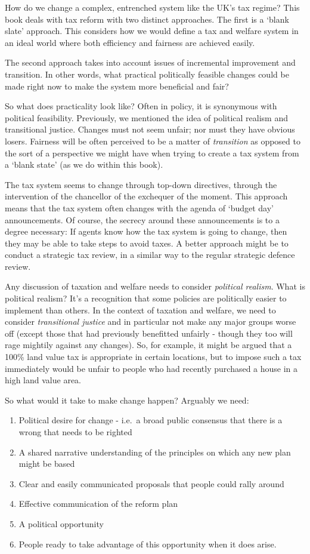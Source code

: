 \documentclass[]{tufte-handout}
\providecommand{\tightlist}{%
  \setlength{\itemsep}{0pt}\setlength{\parskip}{0pt}}
\begin{document}
How do we change a complex, entrenched system like the UK's tax regime?
This book deals with tax reform with two distinct approaches. The first
is a `blank slate' approach. This considers how we would define a tax
and welfare system in an ideal world where both efficiency and fairness
are achieved easily.

The second approach takes into account issues of incremental improvement
and transition. In other words, what practical politically feasible
changes could be made right now to make the system more beneficial and
fair?

So what does practicality look like? Often in policy, it is synonymous
with political feasibility. Previously, we mentioned the idea of
political realism and transitional justice. Changes must not seem
unfair; nor must they have obvious losers. Fairness will be often
perceived to be a matter of \emph{transition} as opposed to the sort of
a perspective we might have when trying to create a tax system from a
`blank state' (as we do within this book).

The tax system seems to change through top-down directives, through the
intervention of the chancellor of the exchequer of the moment. This
approach means that the tax system often changes with the agenda of
`budget day' announcements. Of course, the secrecy around these
announcements is to a degree necessary: If agents know how the tax
system is going to change, then they may be able to take steps to avoid
taxes. A better approach might be to conduct a strategic tax review, in
a similar way to the regular strategic defence review.

Any discussion of taxation and welfare needs to consider \emph{political
realism}. What is political realism? It's a recognition that some
policies are politically easier to implement than others. In the context
of taxation and welfare, we need to consider \emph{transitional justice}
and in particular not make any major groups worse off (except those that
had previously benefitted unfairly - though they too will rage mightily
against any changes). So, for example, it might be argued that a 100\%
land value tax is appropriate in certain locations, but to impose such a
tax immediately would be unfair to people who had recently purchased a
house in a high land value area.

So what would it take to make change happen? Arguably we need:

\begin{enumerate}
\def\labelenumi{\arabic{enumi}.}
\tightlist
\item
  Political desire for change - i.e.~a broad public consensus that there
  is a wrong that needs to be righted
\item
  A shared narrative understanding of the principles on which any new
  plan might be based
\item
  Clear and easily communicated proposals that people could rally around
\item
  Effective communication of the reform plan
\item
  A political opportunity
\item
  People ready to take advantage of this opportunity when it does arise.
\end{enumerate}
\end{document}
